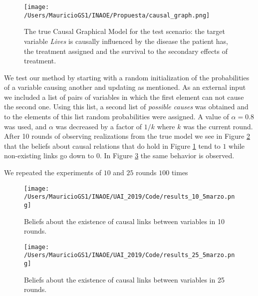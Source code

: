 \documentclass[letterpaper]{article}
\begin{document}
\begin{figure}[ht]
\vskip 0.2in
\begin{center}
\centerline{\texttt{[image: /Users/MauricioGS1/INAOE/Propuesta/causal\_graph.png]}}
\caption{The true Causal Graphical Model for the test scenario: the target variable \textit{Lives} is causally influenced by the disease the patient has, the treatment assigned and the survival to the secondary effects of treatment.}
\label{causal_model}
\end{center}
\vskip -0.2in
\end{figure}

We test our method by starting with a random initialization of the probabilities of a variable causing another and updating as mentioned. As an external input we included a list of pairs of variables in which the first element can not cause the second one. Using this list, a second list of \textit{possible causes} was obtained and to the elements of this list random probabilities were assigned. A value of $\alpha=0.8$ was used, and $\alpha$ was decreased by a factor of $1/k$ where $k$ was the current round. After 10 rounds of observing realizations from the true model we see in Figure \ref{10_rounds} that the beliefs about causal relations that do hold in Figure \ref{causal_model} tend to $1$ while non-existing links go down to $0$. In Figure \ref{25_rounds} the same behavior is observed.

We repeated the experiments of $10$ and $25$ rounds $100$ times

\begin{figure}[ht]
\vskip 0.2in
\begin{center}
\centerline{\texttt{[image: /Users/MauricioGS1/INAOE/UAI\_2019/Code/results\_10\_5marzo.png]}}
\caption{Beliefs about the existence of causal links between variables in 10 rounds.}
\label{10_rounds}
\end{center}
\vskip -0.2in
\end{figure}

\begin{figure}[ht]
\vskip 0.2in
\begin{center}
\centerline{\texttt{[image: /Users/MauricioGS1/INAOE/UAI\_2019/Code/results\_25\_5marzo.png]}}
\caption{Beliefs about the existence of causal links between variables in 25 rounds.}
\label{25_rounds}
\end{center}
\vskip -0.2in
\end{figure}
\end{document}
